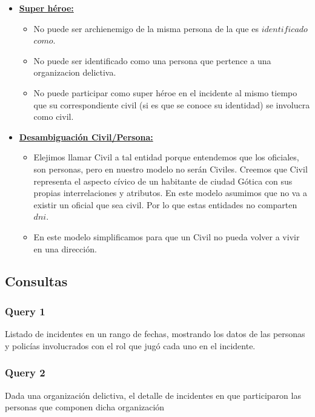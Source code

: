 \begin{itemize}
\item\uline{\textbf{Super héroe:}}
\begin{itemize}
\item No puede ser archienemigo de la misma persona de la que es $identificado$ $como$.
\item No puede ser identificado como una persona que pertence a una organizacion delictiva.
\item No puede participar como super héroe en el incidente al mismo tiempo que su correspondiente civil (si es que se conoce su identidad) se involucra como civil.
\end{itemize}
\item\uline{\textbf{Desambiguación Civil/Persona:}}
\begin{itemize}
\item  Elejimos llamar Civil a tal entidad porque entendemos que los oficiales, son personas, pero en nuestro modelo no serán Civiles. Creemos que Civil representa el aspecto cívico de un habitante de ciudad Gótica con sus propias interrelaciones y atributos.
En este modelo asumimos que no va a existir un oficial que sea civil. Por lo que estas entidades no comparten $dni$.
\item En este modelo simplificamos para que un Civil no pueda volver a vivir en una dirección.

\end{itemize}
\end{itemize}

\newpage
\subsection{Consultas}

\subsubsection{Query 1}
Listado de incidentes en un rango de fechas, mostrando los datos de las personas y policías involucrados con el rol que jugó cada uno en el incidente.



\subsubsection{Query 2}
Dada una organización delictiva, el detalle de incidentes en que participaron
las personas que componen dicha organización



